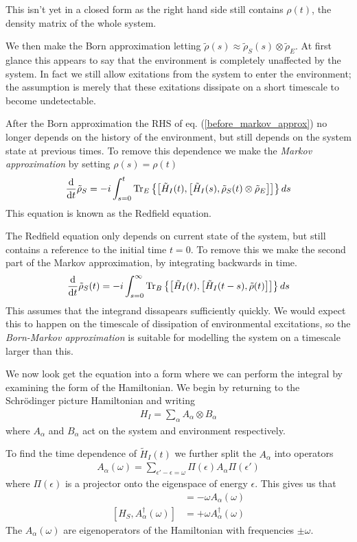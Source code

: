 This isn't yet in a closed form as the right hand side still contains $\rho(t)$, the density matrix of the whole system.

We then make the Born approximation letting $\tilde{\rho}(s) \approx \tilde{\rho}_S(s) \otimes \tilde{\rho}_E$. At first glance this appears to say that the environment is completely unaffected by the system. In fact we still allow exitations from the system to enter the environment; the assumption is merely that these exitations dissipate on a short timescale to become undetectable.

After the Born approximation the RHS of eq. (\ref{before_markov_approx}) no longer depends on the history of the environment, but still depends on the system state at previous times. To remove this dependence we make the \textit{Markov approximation} by setting $\rho(s) = \rho(t)$
\begin{align}
  \frac{\mathrm{d}}{\mathrm{d}t} \tilde{\rho}_S = -i \int_{s=0}^t \operatorname{Tr}_E\left\{\left[ \tilde{H}_I(t), \left[ \tilde{H}_I(s), \tilde{\rho}_S(t)\otimes\tilde{\rho}_E \right] \right]\right\} ds
\end{align}
This equation is known as the Redfield equation. 

The Redfield equation only depends on current state of the system, but still contains a reference to the initial time $t=0$. To remove this we make the second part of the Markov approximation, by integrating backwards in time. 
\begin{align}
  \label{redfield_eq}
  \frac{\mathrm{d}}{\mathrm{d}t} \tilde{\rho}_S(t) = -i \int_{s=0}^\infty \operatorname{Tr}_B\left\{\left[ \tilde{H}_I(t), \left[ \tilde{H}_I(t-s), \tilde{\rho}(t) \right] \right]\right\} ds
\end{align}
This assumes that the integrand dissapears sufficiently quickly. We would expect this to happen on the timescale of dissipation of environmental excitations, so the \textit{Born-Markov approximation} is suitable for modelling the system on a timescale larger than this.

We now look get the equation into a form where we can perform the integral by examining the form of the Hamiltonian. We begin by returning to the Schr\"odinger picture Hamiltonian and writing
\begin{align}
  H_I = \sum_\alpha A_\alpha \otimes B_\alpha
\end{align}
where $A_\alpha$ and $B_\alpha$ act on the system and environment respectively.

To find the time dependence of $\tilde{H}_I(t)$ we further split the $A_\alpha$ into operators 
\begin{align}
  A_\alpha(\omega) = \sum_{\epsilon' - \epsilon = \omega} \Pi(\epsilon)A_\alpha \Pi(\epsilon')
\end{align}
where $\Pi(\epsilon)$ is a projector onto the eigenspace of energy $\epsilon$. This gives us that
\begin{align}
  [H_S, A_\alpha(\omega)] &= - \omega A_\alpha(\omega) \\
  [H_S, A^\dagger_\alpha(\omega)] &= + \omega A^\dagger_\alpha(\omega)
\end{align}
The $A_\alpha(\omega)$ are eigenoperators of the Hamiltonian with frequencies $\pm \omega$.

